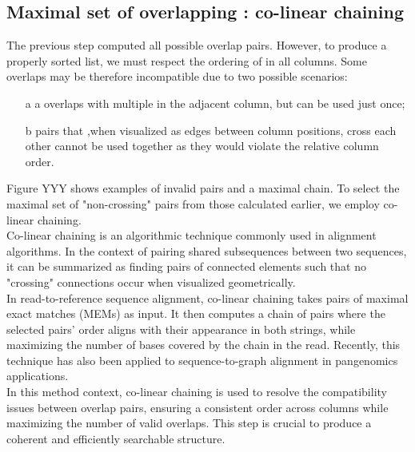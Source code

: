 \subsection{Maximal set of overlapping \kmers: co-linear chaining}
The previous step computed all possible \kmer overlap pairs. However, to produce a properly sorted list, we must respect the ordering of \kmers in all columns. Some overlaps may be therefore incompatible due to two possible scenarios:
\begin{itemize}
	\item[a] a \kmer overlaps with multiple \kmers in the adjacent column, but can be used just once;
	\item[b] pairs that ,when visualized as edges between column positions, cross each other cannot be used together as they would violate the relative column order.
\end{itemize}
Figure YYY shows examples of invalid pairs and a maximal chain. To select the maximal set of "non-crossing" pairs from those calculated earlier, we employ co-linear chaining.\\
Co-linear chaining is an algorithmic technique commonly used in alignment algorithms. In the context of pairing shared subsequences between two sequences, it can be summarized as finding pairs of connected elements such that no "crossing" connections occur when visualized geometrically. \\
In read-to-reference sequence alignment, co-linear chaining takes pairs of maximal exact matches (MEMs) as input. It then computes a chain of pairs where the selected pairs' order aligns with their appearance in both strings, while maximizing the number of bases covered by the chain in the read. Recently, this technique has also been applied to sequence-to-graph alignment in pangenomics applications.\\
In this method context, co-linear chaining is used to resolve the compatibility issues between \kmer overlap pairs, ensuring a consistent order across columns while maximizing the number of valid overlaps. This step is crucial to produce a coherent and efficiently searchable structure.

